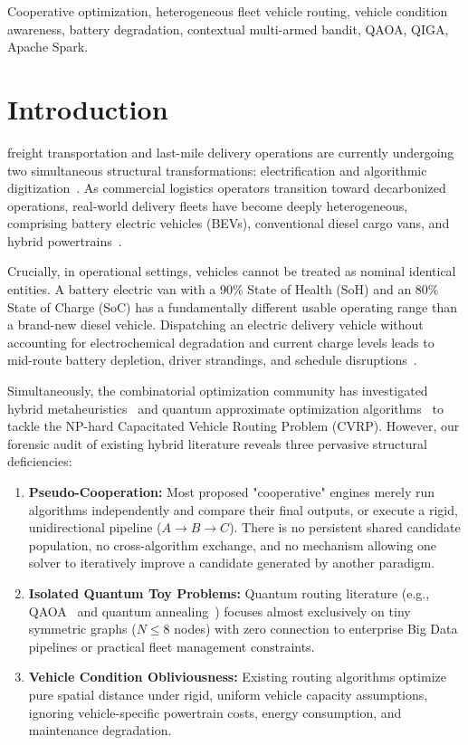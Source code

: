 \documentclass[journal,10pt]{IEEEtran}
\begin{document}
\begin{IEEEkeywords}
Cooperative optimization, heterogeneous fleet vehicle routing, vehicle condition awareness, battery degradation, contextual multi-armed bandit, QAOA, QIGA, Apache Spark.
\end{IEEEkeywords}

\section{Introduction}
 freight transportation and last-mile delivery operations are currently undergoing two simultaneous structural transformations: electrification and algorithmic digitization~\cite{toth2014vehicle,schneider2014electric}. As commercial logistics operators transition toward decarbonized operations, real-world delivery fleets have become deeply heterogeneous, comprising battery electric vehicles (BEVs), conventional diesel cargo vans, and hybrid powertrains~\cite{pelletier2016battery,koc2016heterogeneous}. 

Crucially, in operational settings, vehicles cannot be treated as nominal identical entities. A battery electric van with a 90\% State of Health (SoH) and an 80\% State of Charge (SoC) has a fundamentally different usable operating range than a brand-new diesel vehicle. Dispatching an electric delivery vehicle without accounting for electrochemical degradation and current charge levels leads to mid-route battery depletion, driver strandings, and schedule disruptions~\cite{pelletier2019goods}.

Simultaneously, the combinatorial optimization community has investigated hybrid metaheuristics~\cite{burke2013hyper,pisinger2007general} and quantum approximate optimization algorithms~\cite{farhi2014qaoa,hadfield2019qaoa,feld2019hybrid} to tackle the NP-hard Capacitated Vehicle Routing Problem (CVRP). However, our forensic audit of existing hybrid literature reveals three pervasive structural deficiencies:
\begin{enumerate}
    \item \textbf{Pseudo-Cooperation:} Most proposed "cooperative" engines merely run algorithms independently and compare their final outputs, or execute a rigid, unidirectional pipeline ($A \to B \to C$). There is no persistent shared candidate population, no cross-algorithm exchange, and no mechanism allowing one solver to iteratively improve a candidate generated by another paradigm.
    \item \textbf{Isolated Quantum Toy Problems:} Quantum routing literature (e.g., QAOA~\cite{azad2022solving} and quantum annealing~\cite{feld2019hybrid}) focuses almost exclusively on tiny symmetric graphs ($N \le 8$ nodes) with zero connection to enterprise Big Data pipelines or practical fleet management constraints.
    \item \textbf{Vehicle Condition Obliviousness:} Existing routing algorithms optimize pure spatial distance under rigid, uniform vehicle capacity assumptions, ignoring vehicle-specific powertrain costs, energy consumption, and maintenance degradation.
\end{enumerate}
\end{document}
